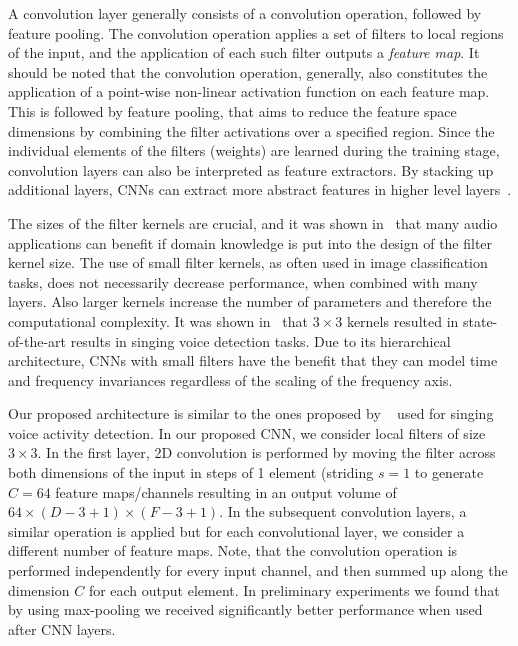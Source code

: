 A convolution layer generally consists of a convolution operation, followed by feature pooling.
The convolution operation applies a set of filters to local regions of the input, and the application of each such filter outputs a \emph{feature map}.
It should be noted that the convolution operation, generally, also constitutes the application of a point-wise non-linear activation function on each feature map.
This is followed by feature pooling, that aims to reduce the feature space dimensions by combining the filter activations over a specified region.
Since the individual elements of the filters (weights) are learned during the training stage, convolution layers can also be interpreted as feature extractors.
By stacking up additional layers, CNNs can extract more abstract features in higher level layers~\cite{Simonyan15}.
\par
The sizes of the filter kernels are crucial, and it was shown in~\cite{pons2017timbre} that many audio applications can benefit if domain knowledge is put into the design of the filter kernel size.
The use of small filter kernels, as often used in image classification tasks, does not necessarily decrease performance, when combined with many layers.
Also larger kernels increase the number of parameters and therefore the computational complexity.
It was shown in~\cite{schluter15} that \(3 \times 3\) kernels resulted in state-of-the-art results in singing voice detection tasks.
Due to its hierarchical architecture, CNNs with small filters have the benefit that they can model time and frequency invariances regardless of the scaling of the frequency axis.
\par
Our proposed architecture is similar to the ones proposed by ~\cite{schluter16} used for singing voice activity detection.
In our proposed CNN, we consider local filters of size \(3 \times 3\). In the first layer, 2D convolution is performed by moving the filter across both dimensions of the input in steps of 1 element (striding \(s = 1\) to generate \(C = 64\) feature maps/channels resulting in an output volume of \(64 \times (D - 3 + 1) \times (F - 3 + 1)\).
In the subsequent convolution layers, a similar operation is applied but for each convolutional layer, we consider a different number of feature maps.
Note, that the convolution operation is performed independently for every input channel, and then summed up along the dimension \(C\) for each output element.
In preliminary experiments we found that by using max-pooling we received significantly better performance when used after CNN layers.

